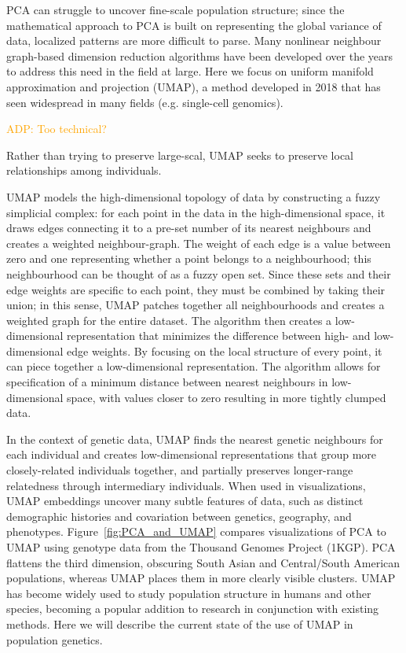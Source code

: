 \documentclass[12pt]{article}
\newcommand{\adpcomment}[1]{{\textcolor{orange}{ADP: #1}}}
\begin{document}
PCA can struggle to uncover fine-scale population structure; since the mathematical approach to PCA is built on representing the global variance of data, localized patterns are more difficult to parse. Many nonlinear neighbour graph-based dimension reduction algorithms have been developed over the years to address this need in the field at large. Here we focus on uniform manifold approximation and projection (UMAP)\cite{mcinnes_umap_2018}, a method developed in 2018 that has seen widespread in many fields (e.g. single-cell genomics\cite{becht_dimensionality_2019}). 

\adpcomment{Too technical?}

Rather than trying to preserve large-scal, UMAP seeks to preserve local relationships among individuals.  

UMAP models the high-dimensional topology of data by constructing a fuzzy simplicial complex: for each point in the data in the high-dimensional space, it draws edges connecting it to a pre-set number of its nearest neighbours and creates a weighted neighbour-graph. The weight of each edge is a value between zero and one representing whether a point belongs to a neighbourhood; this neighbourhood can be thought of as a fuzzy open set. Since these sets and their edge weights are specific to each point, they must be combined by taking their union; in this sense, UMAP patches together all neighbourhoods and creates a weighted graph for the entire dataset. The algorithm then creates a low-dimensional representation that minimizes the difference between high- and low-dimensional edge weights. By focusing on the local structure of every point, it can piece together a low-dimensional representation. The algorithm allows for specification of a minimum distance between nearest neighbours in low-dimensional space, with values closer to zero resulting in more tightly clumped data.

In the context of genetic data, UMAP finds the nearest genetic neighbours for each individual and creates low-dimensional representations that group more closely-related individuals together, and partially preserves longer-range relatedness through intermediary individuals. When used in visualizations, UMAP embeddings uncover many subtle features of data, such as distinct demographic histories and covariation between genetics, geography, and phenotypes\cite{diaz-papkovich_umap_2019}. Figure~\ref{fig:PCA_and_UMAP} compares visualizations of PCA to UMAP using genotype data from the Thousand Genomes Project (1KGP)\cite{10002015global}. PCA flattens the third dimension, obscuring South Asian and Central/South American populations, whereas UMAP places them in more clearly visible clusters. UMAP has become widely used to study population structure in humans and other species, becoming a popular addition to research in conjunction with existing methods. Here we will describe the current state of the use of UMAP in population genetics.
\end{document}
